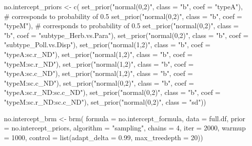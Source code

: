 \documentclass[11pt,]{article}
\newenvironment{Shaded}{}{}
\newcommand{\KeywordTok}[1]{\textcolor[rgb]{0.00,0.00,1.00}{#1}}
\newcommand{\DataTypeTok}[1]{#1}
\newcommand{\DecValTok}[1]{#1}
\newcommand{\FloatTok}[1]{#1}
\newcommand{\StringTok}[1]{\textcolor[rgb]{0.00,0.50,0.50}{#1}}
\newcommand{\CommentTok}[1]{\textcolor[rgb]{0.00,0.50,0.00}{#1}}
\newcommand{\NormalTok}[1]{#1}
\begin{document}
\begin{Shaded}
\begin{Highlighting}[]
\NormalTok{no.intercept_priors <-}\StringTok{ }\KeywordTok{c}\NormalTok{(}
  \KeywordTok{set_prior}\NormalTok{(}\StringTok{"normal(0,2)"}\NormalTok{, }\DataTypeTok{class =} \StringTok{"b"}\NormalTok{, }\DataTypeTok{coef =} \StringTok{"typeA"}\NormalTok{), }\CommentTok{# corresponds to probability of 0.5}
  \KeywordTok{set_prior}\NormalTok{(}\StringTok{"normal(0,2)"}\NormalTok{, }\DataTypeTok{class =} \StringTok{"b"}\NormalTok{, }\DataTypeTok{coef =} \StringTok{"typeM"}\NormalTok{), }\CommentTok{# corresponds to probability of 0.5}
  \KeywordTok{set_prior}\NormalTok{(}\StringTok{"normal(0,2)"}\NormalTok{, }\DataTypeTok{class =} \StringTok{"b"}\NormalTok{, }\DataTypeTok{coef =} \StringTok{"subtype_Herb.vs.Para"}\NormalTok{),}
  \KeywordTok{set_prior}\NormalTok{(}\StringTok{"normal(0,2)"}\NormalTok{, }\DataTypeTok{class =} \StringTok{"b"}\NormalTok{, }\DataTypeTok{coef =} \StringTok{"subtype_Poll.vs.Disp"}\NormalTok{),}
  \KeywordTok{set_prior}\NormalTok{(}\StringTok{"normal(1,2)"}\NormalTok{, }\DataTypeTok{class =} \StringTok{"b"}\NormalTok{, }\DataTypeTok{coef =} \StringTok{"typeA:sc.r_ND"}\NormalTok{),}
  \KeywordTok{set_prior}\NormalTok{(}\StringTok{"normal(1,2)"}\NormalTok{, }\DataTypeTok{class =} \StringTok{"b"}\NormalTok{, }\DataTypeTok{coef =} \StringTok{"typeM:sc.r_ND"}\NormalTok{),}
  \KeywordTok{set_prior}\NormalTok{(}\StringTok{"normal(1,2)"}\NormalTok{, }\DataTypeTok{class =} \StringTok{"b"}\NormalTok{, }\DataTypeTok{coef =} \StringTok{"typeA:sc.c_ND"}\NormalTok{),}
  \KeywordTok{set_prior}\NormalTok{(}\StringTok{"normal(1,2)"}\NormalTok{, }\DataTypeTok{class =} \StringTok{"b"}\NormalTok{, }\DataTypeTok{coef =} \StringTok{"typeM:sc.c_ND"}\NormalTok{),}
  \KeywordTok{set_prior}\NormalTok{(}\StringTok{"normal(0,2)"}\NormalTok{, }\DataTypeTok{class =} \StringTok{"b"}\NormalTok{, }\DataTypeTok{coef =} \StringTok{"typeA:sc.r_ND:sc.c_ND"}\NormalTok{),}
  \KeywordTok{set_prior}\NormalTok{(}\StringTok{"normal(0,2)"}\NormalTok{, }\DataTypeTok{class =} \StringTok{"b"}\NormalTok{, }\DataTypeTok{coef =} \StringTok{"typeM:sc.r_ND:sc.c_ND"}\NormalTok{),}
  \KeywordTok{set_prior}\NormalTok{(}\StringTok{"normal(0,2)"}\NormalTok{, }\DataTypeTok{class =} \StringTok{"sd"}\NormalTok{))}

\NormalTok{no.intercept_brm <-}\StringTok{ }\KeywordTok{brm}\NormalTok{(}
  \DataTypeTok{formula =}\NormalTok{ no.intercept_formula, }\DataTypeTok{data =}\NormalTok{ full.df, }
  \DataTypeTok{prior =}\NormalTok{ no.intercept_priors, }\DataTypeTok{algorithm =} \StringTok{"sampling"}\NormalTok{, }
  \DataTypeTok{chains =} \DecValTok{4}\NormalTok{, }\DataTypeTok{iter =} \DecValTok{2000}\NormalTok{, }\DataTypeTok{warmup =} \DecValTok{1000}\NormalTok{, }
  \DataTypeTok{control =} \KeywordTok{list}\NormalTok{(}\DataTypeTok{adapt_delta =} \FloatTok{0.99}\NormalTok{, }\DataTypeTok{max_treedepth =} \DecValTok{20}\NormalTok{))}
\end{Highlighting}
\end{Shaded}
\end{document}
